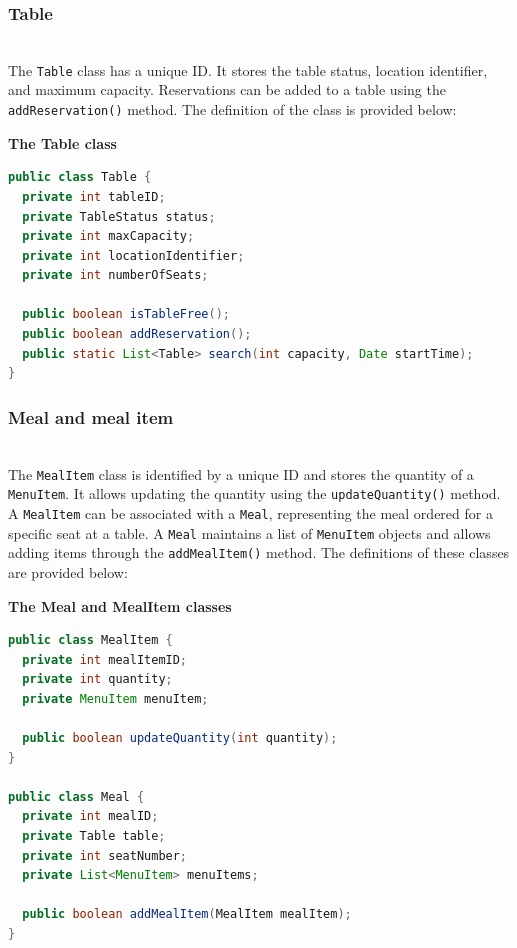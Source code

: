 \subsubsection{Table}\label{erg35N71o_M8cbDkeUrIA}
\\
The \texttt{Table} class has a unique ID. It stores the table status, location identifier, and maximum capacity. Reservations can be added to a table using the \texttt{addReservation()} method. The definition of the class is provided below:

\textbf{The Table class}

\begin{lstlisting}[language=Java]
public class Table {
  private int tableID;
  private TableStatus status;
  private int maxCapacity;
  private int locationIdentifier;
  private int numberOfSeats;

  public boolean isTableFree();
  public boolean addReservation();
  public static List<Table> search(int capacity, Date startTime);
}
\end{lstlisting}

\subsubsection{Meal and meal item}\label{48LGpiNcUoLwvjvjON_b1}
\\
The \texttt{MealItem} class is identified by a unique ID and stores the quantity of a \texttt{MenuItem}. It allows updating the quantity using the \texttt{updateQuantity()} method. A \texttt{MealItem} can be associated with a \texttt{Meal}, representing the meal ordered for a specific seat at a table. A \texttt{Meal} maintains a list of \texttt{MenuItem} objects and allows adding items through the \texttt{addMealItem()} method. The definitions of these classes are provided below:

\textbf{The Meal and MealItem classes}

\begin{lstlisting}[language=Java]
public class MealItem {
  private int mealItemID;
  private int quantity;
  private MenuItem menuItem;

  public boolean updateQuantity(int quantity);
}

public class Meal {
  private int mealID;
  private Table table;
  private int seatNumber;
  private List<MenuItem> menuItems;

  public boolean addMealItem(MealItem mealItem);
}
\end{lstlisting}

